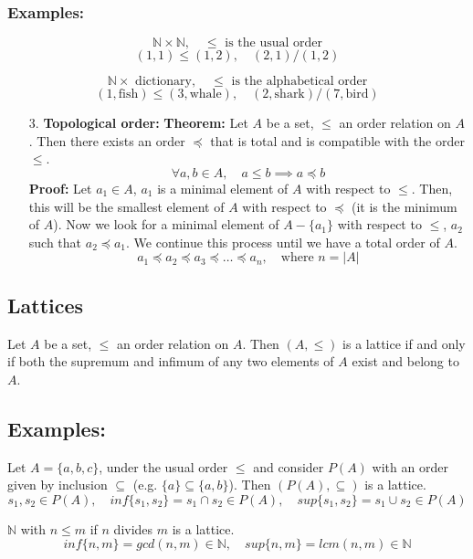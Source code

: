 \documentclass[11pt]{article}
\begin{document}
\subsubsection*{Examples:}
\[
\mathbb{N} \times \mathbb{N}, \quad \leq \text{ is the usual order}
\]
\[
(1,1) \leq (1,2), \quad (2,1) / (1,2)
\]

\[
\mathbb{N} \times \text{ dictionary}, \quad \leq \text{ is the alphabetical order}
\]
\[
(1, \text{fish}) \leq (3, \text{whale}), \quad (2, \text{shark}) / (7, \text{bird})
\]

\begin{enumerate}
    \item[3.] \textbf{Topological order: } \textbf{Theorem: } Let $A$ be a set, $\leq$ an order relation on $A$. Then there exists an order $\preceq$ that is total and is compatible with the order $\leq$.
    \[
    \forall a, b \in A, \quad a \leq b \implies a \preceq b 
    \]
    \textbf{Proof: } Let $a_1 \in A$, $a_1$ is a minimal element of $A$ with respect to $\leq$. Then, this will be the smallest element of $A$ with respect to $\preceq$ (it is the minimum of $A$). Now we look for a minimal element of $A - \{a_1\}$ with respect to $\leq$, $a_2$ such that $a_2 \preceq a_1$. We continue this process until we have a total order of $A$.
    \[
    a_1 \preceq a_2 \preceq a_3 \preceq \ldots \preceq a_n, \quad \text{where } n = |A|
    \]
\end{enumerate}

\subsection{Lattices}
Let $A$ be a set, $\leq$ an order relation on $A$. Then $(A, \leq)$ is a lattice if and only if both the supremum and infimum of any two elements of $A$ exist and belong to $A$.

\subsection*{Examples:}
Let $A = \{a,b,c\}$, under the usual order $\leq$ and consider $P(A)$ with an order given by inclusion $\subseteq$ (e.g. $\{a\} \subseteq \{a,b\}$). Then $(P(A), \subseteq)$ is a lattice.
\[
s_1, s_2 \in P(A), \quad inf \{s_1, s_2\} = s_1 \cap s_2 \in P(A), \quad sup \{s_1, s_2\} = s_1 \cup s_2 \in P(A)
\]

$\mathbb{N}$ with $n \leq m$ if $n$ divides $m$ is a lattice.
\[
inf \{n,m\} = gcd(n,m) \in \mathbb{N}, \quad sup \{n,m\} = lcm(n,m) \in \mathbb{N}
\]
\end{document}
